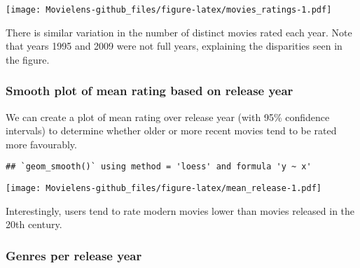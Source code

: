 \documentclass[]{article}
\newenvironment{Shaded}{\begin{snugshade}}{\end{snugshade}}
\newcommand{\DataTypeTok}[1]{\textcolor[rgb]{0.13,0.29,0.53}{#1}}
\newcommand{\KeywordTok}[1]{\textcolor[rgb]{0.13,0.29,0.53}{\textbf{#1}}}
\newcommand{\NormalTok}[1]{#1}
\newcommand{\OperatorTok}[1]{\textcolor[rgb]{0.81,0.36,0.00}{\textbf{#1}}}
\newcommand{\StringTok}[1]{\textcolor[rgb]{0.31,0.60,0.02}{#1}}
\begin{document}
\texttt{[image: Movielens-github\_files/figure-latex/movies\_ratings-1.pdf]}

There is similar variation in the number of distinct movies rated each
year. Note that years 1995 and 2009 were not full years, explaining the
disparities seen in the figure.

\hypertarget{smooth-plot-of-mean-rating-based-on-release-year}{%
\subsubsection{Smooth plot of mean rating based on release
year}\label{smooth-plot-of-mean-rating-based-on-release-year}}

We can create a plot of mean rating over release year (with 95\%
confidence intervals) to determine whether older or more recent movies
tend to be rated more favourably.

\begin{Shaded}
\end{Shaded}

\begin{verbatim}
## `geom_smooth()` using method = 'loess' and formula 'y ~ x'
\end{verbatim}

\texttt{[image: Movielens-github\_files/figure-latex/mean\_release-1.pdf]}

Interestingly, users tend to rate modern movies lower than movies
released in the 20th century.

\hypertarget{genres-per-release-year}{%
\subsubsection{Genres per release year}\label{genres-per-release-year}}
\end{document}
